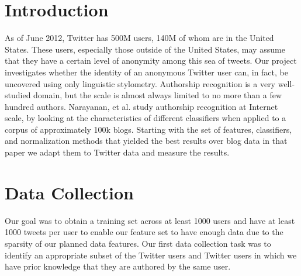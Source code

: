 \documentclass[10pt, conference, compsocconf]{IEEEtran}
\begin{document}




%
\IEEEpeerreviewmaketitle



\section{Introduction}
As of June 2012, Twitter has 500M users, 140M of whom are in the
United States. These users, especially those outside of the United
States, may assume that they have a certain level of anonymity among
this sea of tweets. Our project investigates whether the identity of
an anonymous Twitter user can, in fact, be uncovered using only
linguistic stylometry. Authorship recognition is a very well-studied
domain, but the scale is almost always limited to no more than a few
hundred authors. Narayanan, et al.\cite{Narayanan} study authorship recognition at
Internet scale, by looking at the characteristics of different
classifiers when applied to a corpus of approximately 100k
blogs. Starting with the set of features, classifiers, and
normalization methods that yielded the best results over blog data in
that paper we adapt them to Twitter data and measure the results.

\section{Data Collection}
Our goal was to obtain a training set across at least 1000 users and
have at least 1000 tweets per user to enable our feature set to have
enough data due to the sparsity of our planned data features. Our
first data collection task was to identify an appropriate subset of
the Twitter users and Twitter users in which we have prior knowledge
that they are authored by the same user.
\end{document}
